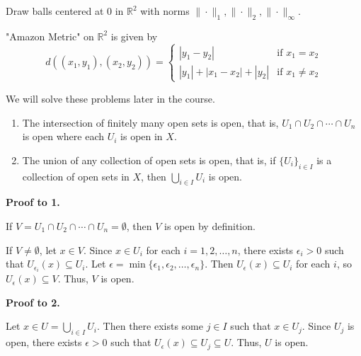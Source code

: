 \documentclass[main.tex]{subfiles}
\begin{document}
\begin{example}
    Draw balls centered at $0$ in $\mathbb{R}^2$ with norms $\|\cdot\|_1, \|\cdot\|_2, \|\cdot\|_{\infty}$. 
\end{example}

\begin{example} 
    "Amazon Metric" on $\mathbb{R}^2$ is given by 
    \[d((x_1, y_1), (x_2, y_2)) = \begin{cases}
    |y_1 - y_2|   &  \text{if } x_1 = x_2  \\
    |y_1| + |x_1 - x_2| + |y_2|   &  \text{if } x_1 \neq x_2
   \end{cases}\] 
\end{example}

\par We will solve these problems later in the course.

\begin{theorem} 
    \begin{enumerate}
        \item The intersection of finitely many open sets is open, that is, $U_1 \cap U_2 \cap \cdots \cap U_n$ is open where each $U_i$ is open in $X$. 
        \item The union of any collection of open sets is open, that is, if $\{U_i\}_{i \in I}$ is a collection of open sets in $X$, then $\bigcup_{i \in I} U_i$ is open.
    \end{enumerate}
\end{theorem}

\par \noindent \textbf{Proof to 1.} 
\par If $V = U_1 \cap U_2 \cap \cdots \cap U_n = \emptyset$, then $V$ is open by definition.
\par If $V \neq \emptyset$, let $x \in V$. Since $x \in U_i$ for each $i = 1, 2, \ldots, n$, there exists $\epsilon_i > 0$ such that $U_{\epsilon_i} (x) \subseteq U_i$. Let $\epsilon = \min\{\epsilon_1, \epsilon_2, \ldots, \epsilon_n\}$. Then $U_{\epsilon} (x) \subseteq U_i$ for each $i$, so $U_{\epsilon} (x) \subseteq V$. Thus, $V$ is open.
\par \noindent \textbf{Proof to 2.}
\par Let $x \in U = \bigcup_{i \in I} U_i$. Then there exists some $j \in I$ such that $x \in U_j$. Since $U_j$ is open, there exists $\epsilon > 0$ such that $U_{\epsilon} (x) \subseteq U_j \subseteq U$. Thus, $U$ is open. 
\end{document}
